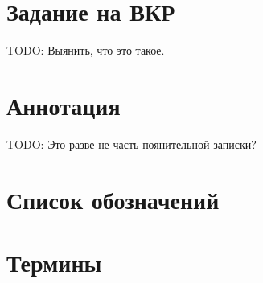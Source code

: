 \chapter*{Задание на ВКР}

TODO: Выянить, что это такое.

\chapter*{Аннотация}

TODO: Это разве не часть поянительной записки?

\chapter*{Список обозначений}

\chapter*{Термины}

